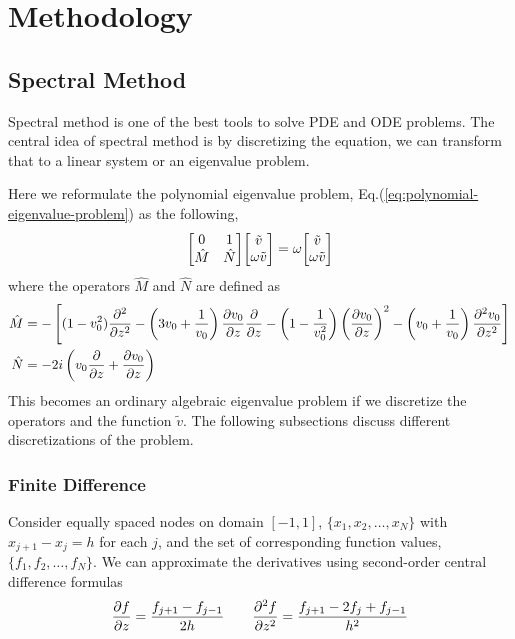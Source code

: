 \chapter{Methodology} \label{chap:methodology}

\section{Spectral Method}
Spectral method is one of the best tools to solve PDE and ODE problems. \cite{trefethen_spectral_2000} The central idea of spectral method is by discretizing the equation, we can transform that to a linear system or an eigenvalue problem.

Here we reformulate the polynomial eigenvalue problem, Eq.(\ref{eq:polynomial-eigenvalue-problem}) as the following, 
\begin{equation} \label{eq:eigenvalue-problem}
	\mqty[ 0 & 1\\ \hat{M} & \hat{N} ]\mqty[ \tilde{v}\\ \omega \tilde{v}] = \omega\mqty[ \tilde{v}\\ \omega \tilde{v}]
\end{equation}
where the operators $\hat{M}$ and $\hat{N}$ are defined as
\begin{align*}
	\hat{M} &= -\left[(1-v_0^2)\pdv[2]{}{z} 
	-\left(3v_0 + \frac{1}{v_0}\right)\pdv{v_0}{z}\pdv{}{z} 
	- \left(1-\frac{1}{v_0^2}\right)\left(\pdv{v_0}{z}\right)^2 
	- \left(v_0+\frac{1}{v_0}\right)\pdv[2]{v_0}{z}\right] \\
	\hat{N} &= -2i\left(v_0\pdv{}{z} +\pdv{v_0}{z} \right) 
\end{align*}
This becomes an ordinary algebraic eigenvalue problem if we discretize the operators and the function $\tilde{v}$. The following subsections discuss different discretizations of the problem.

\subsection{Finite Difference}
Consider equally spaced nodes on domain $[-1,1]$, $\{x_1, x_2, \dots, x_N\}$ with $x_{j+1}-x_{j} = h$ for each $j$, and the set of corresponding function values, $\{ f_1, f_2, \dots, f_N \}$. We can approximate the derivatives using second-order central difference formulas
\[ 
\pdv{f}{z} = \frac{f_{j+1} - f_{j-1}}{2h}
\qquad
\pdv[2]{f}{z} = \frac{f_{j+1} -2f_{j} +f_{j-1}}{h^2}
\]

